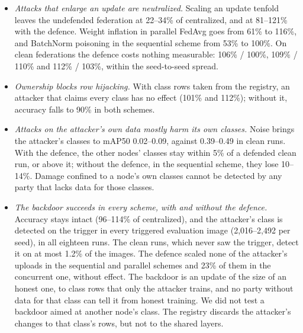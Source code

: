 \documentclass[pdflatex,sn-mathphys-num]{sn-jnl}
\begin{document}
\begin{itemize}
\item \emph{Attacks that enlarge an update are neutralized.} Scaling an update tenfold leaves the undefended federation at 22--34\% of centralized, and at 81--121\% with the defence. Weight inflation in parallel FedAvg goes from 61\% to 116\%, and BatchNorm poisoning in the sequential scheme from 53\% to 100\%. On clean federations the defence costs nothing measurable: 106\% / 100\%, 109\% / 110\% and 112\% / 103\%, within the seed-to-seed spread.
\item \emph{Ownership blocks row hijacking.} With class rows taken from the registry, an attacker that claims every class has no effect (101\% and 112\%); without it, accuracy falls to 90\% in both schemes.
\item \emph{Attacks on the attacker's own data mostly harm its own classes.} Noise brings the attacker's classes to mAP50 0.02--0.09, against 0.39--0.49 in clean runs. With the defence, the other nodes' classes stay within 5\% of a defended clean run, or above it; without the defence, in the sequential scheme, they lose 10--14\%. Damage confined to a node's own classes cannot be detected by any party that lacks data for those classes.
\item \emph{The backdoor succeeds in every scheme, with and without the defence.} Accuracy stays intact (96--114\% of centralized), and the attacker's class is detected on the trigger in every triggered evaluation image (2,016--2,492 per seed), in all eighteen runs. The clean runs, which never saw the trigger, detect it on at most 1.2\% of the images. The defence scaled none of the attacker's uploads in the sequential and parallel schemes and 23\% of them in the concurrent one, without effect. The backdoor is an update of the size of an honest one, to class rows that only the attacker trains, and no party without data for that class can tell it from honest training. We did not test a backdoor aimed at another node's class. The registry discards the attacker's changes to that class's rows, but not to the shared layers.

\end{itemize}
\end{document}
